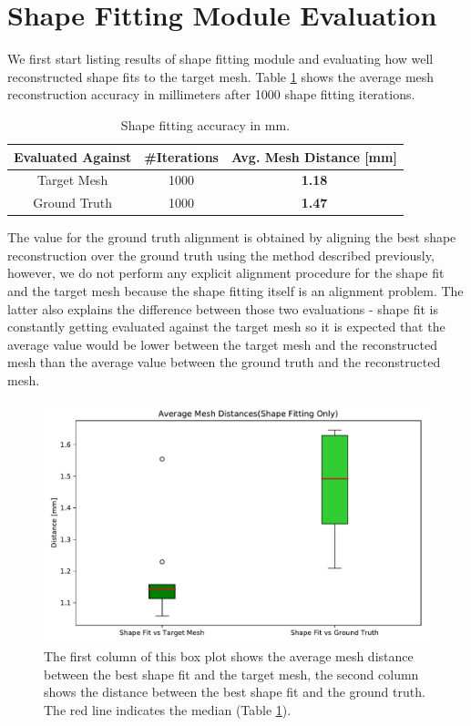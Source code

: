 \section{Shape Fitting Module Evaluation}
We first start listing results of shape fitting module and evaluating how well reconstructed shape fits to the target mesh. Table \ref{t4.1} shows the average mesh reconstruction accuracy in millimeters after 1000 shape fitting iterations. 

\begin{table}[h]
  \centering
  \begin{tabular}{ c|c|c }
      Evaluated Against & \#Iterations & Avg. Mesh Distance [mm]\\
      \hline
      Target Mesh & 1000  & \textbf{1.18} \\
      Ground Truth & 1000 & \textbf{1.47} \\
      \hline
  \end{tabular}
  \caption{Shape fitting accuracy in mm.}
  \label{t4.1}
\end{table}

The value for the ground truth alignment is obtained by aligning the best shape reconstruction over the ground truth using the method described previously, however, we do not perform any explicit alignment procedure for the shape fit and the target mesh because the shape fitting itself is an alignment problem. The latter also explains the difference between those two evaluations - shape fit is constantly getting evaluated against the target mesh so it is expected that the average value would be lower between the target mesh and the reconstructed mesh than the average value between the ground truth and the reconstructed mesh. 

\begin{figure}[h]
  \centering
  \includegraphics[width=\textwidth]{Figures/shapeFittingPlot.pdf}
  \caption{The first column of this box plot shows the average mesh distance between the best shape fit and the target mesh, the second column shows the distance between the best shape fit and the ground truth. The red line indicates the median (Table \ref{t4.1}).}
  \label{f4.1}
\end{figure}

